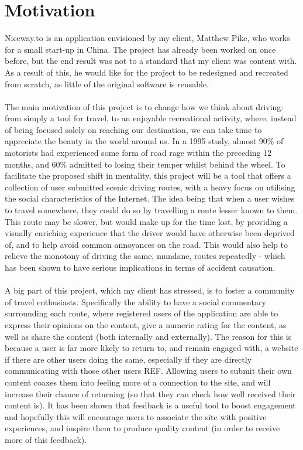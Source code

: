 \section{Motivation}
Niceway.to is an application envisioned by my client, Matthew Pike, who works for a small start-up in China. The project has already been worked on once before, but the end result was not to a standard that my client was content with. As a result of this, he would like for the project to be redesigned and recreated from scratch, as little of the original software is reusable.\ \\
\ \\
The main motivation of this project is to change how we think about driving: from simply a tool for travel, to an enjoyable recreational activity, where, instead of being focused solely on reaching our destination, we can take time to appreciate the beauty in the world around us. In a 1995 study, almost 90\% of motorists had experienced some form of road rage within the preceding 12 months, and 60\% admitted to losing their temper whilst behind the wheel\cite{joint1995road}. To facilitate the proposed shift in mentality, this project will be a tool that offers a collection of user submitted scenic driving routes, with a heavy focus on utilising the social characteristics of the Internet. The idea being that when a user wishes to travel somewhere, they could do so by travelling a route lesser known to them. This route may be slower, but would make up for the time lost, by providing a visually enriching experience that the driver would have otherwise been deprived of, and to help avoid common annoyances on the road. This would also help to relieve the monotony of driving the same, mundane, routes repeatedly - which has been shown to have serious implications in terms of accident causation\cite{thiffault2003monotony}. \ \\
\ \\
A big part of this project, which my client has stressed, is to foster a community of travel enthusiasts. Specifically the ability to have a social commentary surrounding each route, where registered users of the application are able to express their opinions on the content, give a numeric rating for the content, as well as share the content (both internally and externally). The reason for this is because a user is far more likely to return to, and remain engaged with, a website if there are other users doing the same, especially if they are directly communicating with those other users {\color{red}REF}. Allowing users to submit their own content coaxes them into feeling more of a connection to the site, and will increase their chance of returning (so that they can check how well received their content is). It has been shown that feedback is a useful tool to boost engagement\cite{o2008user} and hopefully this will encourage users to associate the site with positive experiences, and inspire them to produce quality content (in order to receive more of this feedback).\ \\
